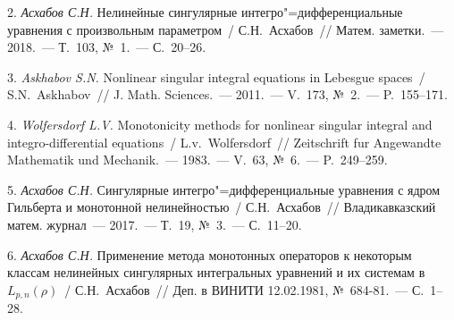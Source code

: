 2. {\it Асхабов С.Н.} Нелинейные сингулярные интегро"=дифференциальные уравнения с произвольным параметром~/ С.Н.~Асхабов~// Матем. заметки.~--- 2018.~--- Т.~103, №~1.~--- С.~20--26.

3. {\it Askhabov S.N.} Nonlinear singular integral equations in Lebesgue spaces~/ S.N.~Askhabov~// J. Math. Sciences.~--- 2011.~--- V.~173, №~2.~--- P.~155--171.

4. {\it Wolfersdorf L.V.} Monotonicity methods for nonlinear singular integral and integro-differential equations~/ L.v.~Wolfersdorf~// Zeitschrift
fur Angewandte Mathematik und Mechanik.~--- 1983.~--- V.~63, №~6.~--- P.~249--259.

5. {\it Асхабов С.Н.} Сингулярные интегро"=дифференциальные уравнения с ядром Гильберта и монотонной нелинейностью~/ С.Н.~Асхабов~// Владикавказский матем. журнал~--- 2017.~--- Т.~19, №~3.~--- С.~11--20.

6. {\it Асхабов С.Н.} Применение метода монотонных операторов к некоторым классам нелинейных сингулярных интегральных уравнений и их системам в $L_{p,n}(\rho)$~/ С.Н.~Асхабов~// Деп. в ВИНИТИ 12.02.1981, №~684-81.~--- С.~1--28.
